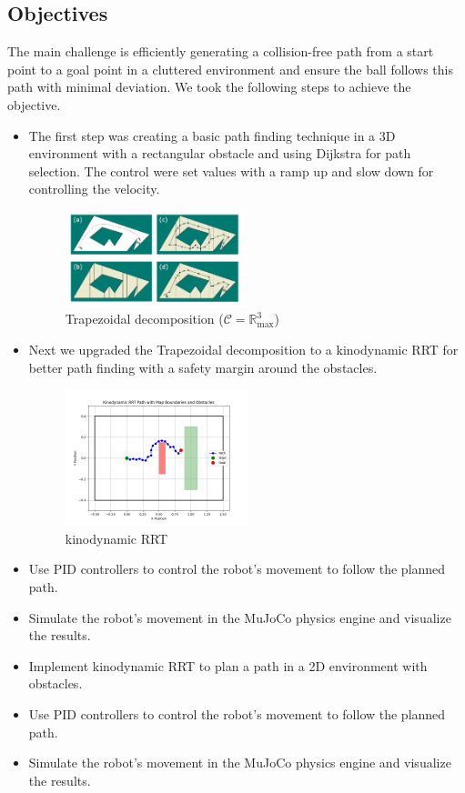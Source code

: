 \documentclass[12pt]{article}
\begin{document}
\subsection{Objectives}
The main challenge is efficiently generating a collision-free path from a start point to a goal point in a cluttered environment and ensure the ball follows this path with minimal deviation. We took the following steps to achieve the objective.
\begin{itemize}
    \item The first step was creating a basic path finding technique in a 3D environment with a rectangular obstacle and using Dijkstra for path selection. The control were set values with a ramp up and slow down for controlling the velocity. 

    \begin{figure}[h!]
      \centering
      \includegraphics[width=0.5\textwidth]{./images/trapezoidal.png}
      \caption{Trapezoidal decomposition (\(\mathcal{C} = \mathbb{R}^3_{\text{max}}\))}
      \label{fig:sample_image}
    \end{figure}

    \item Next we upgraded the Trapezoidal decomposition to a kinodynamic RRT for better path finding with a safety margin around the obstacles. 

    \begin{figure}[h!]
    \centering
      \includegraphics[width=0.5\textwidth]{./images/path.png}
      \caption{kinodynamic RRT}
      \label{fig:sample_image}
    \end{figure}
    
    \item Use PID controllers to control the robot's movement to follow the planned path.
    \item Simulate the robot's movement in the MuJoCo physics engine and visualize the results.
    \item Implement kinodynamic RRT to plan a path in a 2D environment with obstacles.
    \item Use PID controllers to control the robot's movement to follow the planned path.
    \item Simulate the robot's movement in the MuJoCo physics engine and visualize the results.
\end{itemize}
\end{document}
